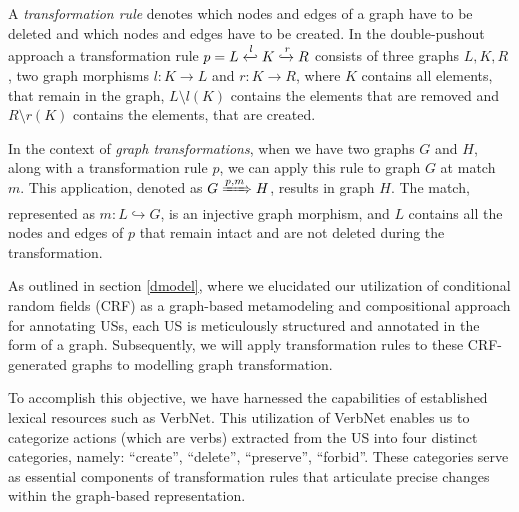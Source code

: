 \begin{definition}
A \emph{transformation rule} denotes which nodes and edges of a graph have to be deleted and which nodes and edges have to be created.
In the double-pushout approach a transformation rule $p = L \xhookleftarrow{l} K \xhookrightarrow{r} R$ consists of three graphs $L,K,R$, two graph morphisms $l: K \to L$ and $r: K \to R$, where $K$ contains all elements, that remain in the graph, $L \setminus l(K)$ contains the elements that are removed and $R \setminus r(K)$ contains the elements, that are created.
\end{definition}
\begin{definition}
In the context of \emph{graph transformations}, when we have two graphs $G$ and $H$, along with a transformation rule $p$, we can apply this rule to graph $G$ at match $m$. This application, denoted as $G \xRightarrow{p,m} H$, results in graph $H$. The match, represented as $m : L \hookrightarrow G$, is an injective graph morphism, and $L$ contains all the nodes and edges of $p$ that remain intact and are not deleted during the transformation.
\end{definition}
As outlined in section \ref{dmodel}, where we elucidated our utilization of conditional random fields (CRF) as a graph-based metamodeling and compositional approach for annotating USs, each US is meticulously structured and annotated in the form of a graph. Subsequently, we will apply transformation rules to these CRF-generated graphs to modelling graph transformation.

To accomplish this objective, we have harnessed the capabilities of established lexical resources such as VerbNet. This utilization of VerbNet enables us to categorize actions (which are verbs) extracted from the US into four distinct categories, namely: \enquote{create}, \enquote{delete}, \enquote{preserve}, \enquote{forbid}. These categories serve as essential components of transformation rules that articulate precise changes within the graph-based representation. 

